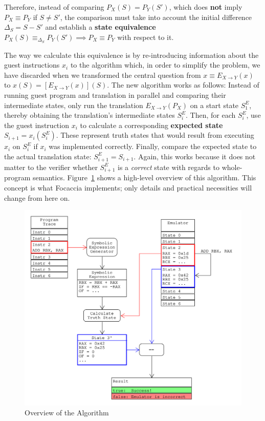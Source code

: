 Therefore, instead of comparing $P_X(S) = P_Y(S')$, which does \textbf{not} imply $P_X \equiv P_Y$ if $S \neq S'$, the
comparison must take into account the initial difference $\Delta_S = S - S'$ and establish a \textbf{state equivalence}
$P_X(S) \equiv_{\Delta_S} P_Y(S') \implies P_X \equiv P_Y$ with respect to it.

The way we calculate this equivalence is by re-introducing information about the guest instructions $x_i$ to the
algorithm which, in order to simplify the problem, we have discarded when we transformed the central question from $x
\equiv E_{X \rightarrow Y}(x)$ to $x(S) = [E_{X \rightarrow Y}(x)](S)$. The new algorithm works as follows: Instead of
running guest program and translation in parallel and comparing their intermediate states, only run the translation
$E_{X \rightarrow Y}(P_X)$ on a start state $S^E_1$, thereby obtaining the translation's intermediate states $S^E_i$.
Then, for each $S^E_i$, use the guest instruction $x_i$ to calculate a corresponding \textbf{expected state} $S_{i+1} =
x_i(S^E_i)$. These represent truth states that would result from executing $x_i$ on $S^E_i$ if $x_i$ was implemented
correctly. Finally, compare the expected state to the actual translation state: $S^E_{i+1} = S_{i+1}$. Again, this works
because it does not matter to the verifier whether $S^E_{i+1}$ is a \textit{correct} state with regards to whole-program
semantics. Figure~\ref{fig:algo_overview} shows a high-level overview of this algorithm. This concept is what Focaccia
implements; only details and practical necessities will change from here on.

\begin{figure}[htpb]
    \centering
    \includegraphics[width=1.0\linewidth]{figures/algorithm_overview.png}
    \caption{Overview of the Algorithm}\label{fig:algo_overview}
\end{figure}

